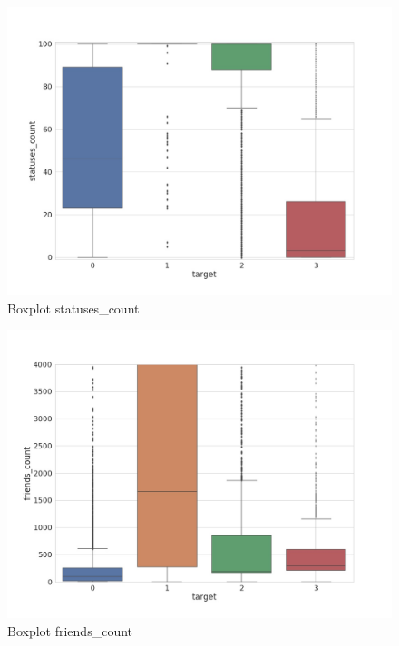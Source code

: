 \begin{figure}
	\centering
	\includegraphics[width=\columnwidth]{chapter3/figure/boxplot.jpg}
	\caption{Boxplot statuses\_count}
	\label{fig:box_statuses}
\end{figure}
\newpage

\begin{figure}
	\centering
	\includegraphics[width=\columnwidth]{chapter3/figure/boxplot_friends.jpg}
	\caption{Boxplot friends\_count}
	\label{fig:box_friends}
\end{figure}

